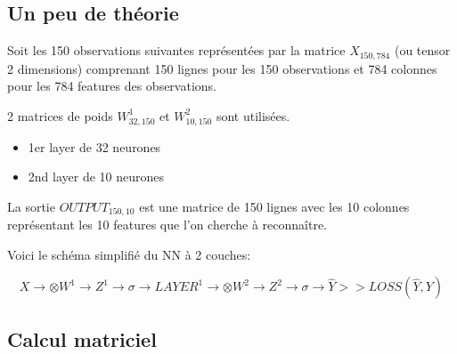 \documentclass[11pt]{book}
\begin{document}
\subsection{Un peu de théorie}

Soit les 150 observations suivantes représentées par la matrice $X_{150,784}$ (ou tensor 2 dimensions) comprenant 150 lignes pour les 150 observations et 784 colonnes pour les 784 features des observations.

2 matrices de poids $W^1_{32,150}$ et $W^2_{10,150}$ sont utilisées.

\begin{itemize}
	\item 1er layer de 32 neurones
	\item 2nd layer de 10 neurones
\end{itemize}

La sortie $OUTPUT_{150,10}$ est une matrice de 150 lignes avec les 10 colonnes représentant 
les 10 features que l'on cherche à reconnaître.

Voici le schéma simplifié du NN à 2 couches:

$$
X \longrightarrow \otimes W^1 \rightarrow  Z^1 \rightarrow \sigma \rightarrow LAYER^1 \longrightarrow
\otimes W^2 
\rightarrow Z^2 
\rightarrow 
\sigma 
\rightarrow \hat{Y} 
>> LOSS(\hat{Y}, Y)
$$

\subsection{Calcul matriciel}
\end{document}
